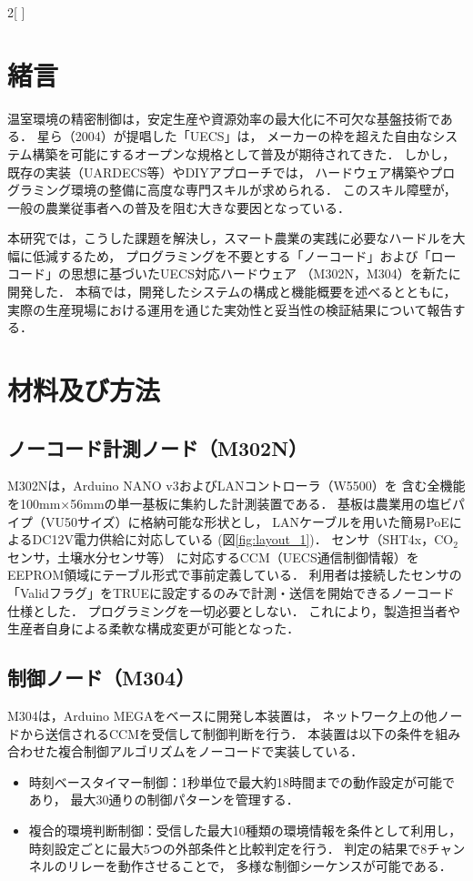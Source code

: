 \documentclass[dvipdfmx]{jsaishoshiki}
\begin{document}
\begin{multicols}{2}[\textwidth=115pt \columnsep=30pt]
  
\section{緒言}
温室環境の精密制御は，安定生産や資源効率の最大化に不可欠な基盤技術である．%
星ら（2004）が提唱した「UECS」は，%
メーカーの枠を超えた自由なシステム構築を可能にするオープンな規格として普及が期待されてきた．%
しかし，既存の実装（UARDECS等）やDIYアプローチでは，%
ハードウェア構築やプログラミング環境の整備に高度な専門スキルが求められる．%
このスキル障壁が，一般の農業従事者への普及を阻む大きな要因となっている．

本研究では，こうした課題を解決し，スマート農業の実践に必要なハードルを大幅に低減するため，%
プログラミングを不要とする「ノーコード」および「ローコード」の思想に基づいたUECS対応ハードウェア%
（M302N，M304）を新たに開発した．
本稿では，開発したシステムの構成と機能概要を述べるとともに，%
実際の生産現場における運用を通じた実効性と妥当性の検証結果について報告する．

\section{材料及び方法}
\subsection{ノーコード計測ノード（M302N）}
M302Nは，Arduino NANO v3およびLANコントローラ（W5500）を%
含む全機能を100mm×56mmの単一基板に集約した計測装置である．
基板は農業用の塩ビパイプ（VU50サイズ）に格納可能な形状とし，
LANケーブルを用いた簡易PoEによるDC12V電力供給に対応している
(図\ref{fig:layout_1})．
センサ（SHT4x，CO$_2$センサ，土壌水分センサ等）%
に対応するCCM（UECS通信制御情報）をEEPROM領域にテーブル形式で事前定義している．
利用者は接続したセンサの「Validフラグ」をTRUEに設定するのみで計測・送信を開始できるノーコード仕様とした．
プログラミングを一切必要としない．
これにより，製造担当者や生産者自身による柔軟な構成変更が可能となった．

\subsection{制御ノード（M304）}
M304は，Arduino MEGAをベースに開発し本装置は，%
ネットワーク上の他ノードから送信されるCCMを受信して制御判断を行う．
本装置は以下の条件を組み合わせた複合制御アルゴリズムをノーコードで実装している．
\begin{itemize}
\item 時刻ベースタイマー制御：1秒単位で最大約18時間までの動作設定が可能であり，%
  最大30通りの制御パターンを管理する．
\item 複合的環境判断制御：受信した最大10種類の環境情報を条件として利用し，%
  時刻設定ごとに最大5つの外部条件と比較判定を行う．%
  判定の結果で8チャンネルのリレーを動作させることで，%
  多様な制御シーケンスが可能である．
\end{itemize}


\end{multicols}
\end{document}
